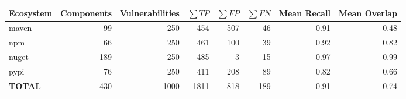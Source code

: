 \begin{table}[!t]
\centering
\small
\begin{tabular}{lrrrrrrr}
\toprule
Ecosystem & Components & Vulnerabilities & $\sum TP$ & $\sum FP$ & $\sum FN$ & Mean Recall & Mean Overlap \\
\midrule
maven & 99 & 250 & 454 & 507 & 46 & 0.91 & 0.48 \\
npm & 66 & 250 & 461 & 100 & 39 & 0.92 & 0.82 \\
nuget & 189 & 250 & 485 & 3 & 15 & 0.97 & 0.99 \\
pypi & 76 & 250 & 411 & 208 & 89 & 0.82 & 0.66 \\
\midrule
\textbf{TOTAL} & 430 & 1000 & 1811 & 818 & 189 & 0.91 & 0.74 \\
\bottomrule
\end{tabular}
\end{table}
